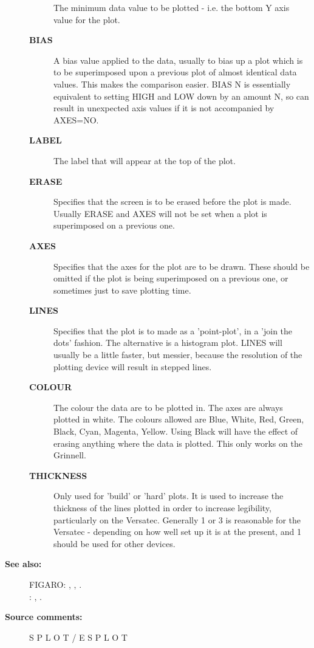 \begin{description}
\begin{description}
 The minimum data value to be plotted - i.e. the bottom
 Y axis value for the plot.
\item [\textbf{BIAS}]
 A bias value applied to the data, usually to bias
 up a plot which is to be superimposed upon a previous plot
 of almost identical data values.  This makes the comparison
 easier.  BIAS N  is essentially equivalent to setting HIGH
 and LOW down by an amount N, so can result in unexpected
 axis values if it is not accompanied by AXES=NO.
\item [\textbf{LABEL}]
 The label that will appear at the top of the plot.
\item [\textbf{ERASE}]
 Specifies that the screen is to be erased before the plot
 is made.  Usually ERASE and AXES will not be set when a
 plot is superimposed on a previous one.
\item [\textbf{AXES}]
 Specifies that the axes for the plot are to be drawn.
 These should be omitted if the plot is being superimposed on
 a previous one, or sometimes just to save plotting time.
\item [\textbf{LINES}]
 Specifies that the plot is to made as a 'point-plot',
 in a 'join the dots' fashion.  The alternative is a histogram
 plot.  LINES will usually be a little faster, but messier,
 because the resolution of the plotting device will result in
 stepped lines.
\item [\textbf{COLOUR}]
 The colour the data are to be plotted in.
 The axes are always plotted in white.  The
 colours allowed are Blue, White, Red, Green, Black, Cyan,
 Magenta, Yellow.  Using Black will have the effect of
 erasing anything where the data is plotted.  This only
 works on the Grinnell.
\item [\textbf{THICKNESS}]
 Only used for 'build' or 'hard' plots.  It is
 used to increase the thickness of the lines plotted in
 order to increase legibility, particularly on the Versatec.
 Generally 1 or 3 is reasonable for the Versatec - depending
 on how well set up it is at the present, and 1 should be
 used for other devices.
\end{description}

\item [\textbf{See also:}]
FIGARO: , , .\\
: , .\\

\item [\textbf{Source comments:}]
\begin{terminalv}
 S P L O T    /    E S P L O T


\end{terminalv}
\end{description}
